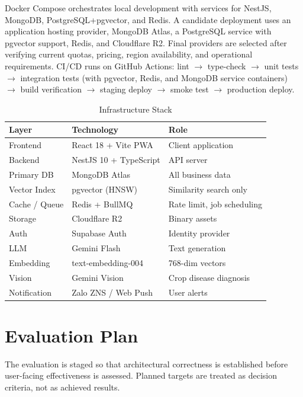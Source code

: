 \documentclass[conference]{IEEEtran}
\begin{document}
Docker Compose orchestrates local development with services for NestJS, MongoDB, PostgreSQL+pgvector, and Redis. A candidate deployment uses an application hosting provider, MongoDB Atlas, a PostgreSQL service with pgvector support, Redis, and Cloudflare R2. Final providers are selected after verifying current quotas, pricing, region availability, and operational requirements. CI/CD runs on GitHub Actions: lint $\to$ type-check $\to$ unit tests $\to$ integration tests (with pgvector, Redis, and MongoDB service containers) $\to$ build verification $\to$ staging deploy $\to$ smoke test $\to$ production deploy.

\begin{table}[htbp]
\caption{Infrastructure Stack}
\label{tab:stack}
\centering
\begin{tabular}{lll}
\toprule
\textbf{Layer} & \textbf{Technology} & \textbf{Role} \\
\midrule
Frontend & React 18 + Vite PWA & Client application \\
Backend & NestJS 10 + TypeScript & API server \\
Primary DB & MongoDB Atlas & All business data \\
Vector Index & pgvector (HNSW) & Similarity search only \\
Cache / Queue & Redis + BullMQ & Rate limit, job scheduling \\
Storage & Cloudflare R2 & Binary assets \\
Auth & Supabase Auth & Identity provider \\
LLM & Gemini Flash & Text generation \\
Embedding & text-embedding-004 & 768-dim vectors \\
Vision & Gemini Vision & Crop disease diagnosis \\
Notification & Zalo ZNS / Web Push & User alerts \\
\bottomrule
\end{tabular}
\end{table}

\section{Evaluation Plan}
\label{sec:evaluation}

The evaluation is staged so that architectural correctness is established before user-facing effectiveness is assessed. Planned targets are treated as decision criteria, not as achieved results.
\end{document}

